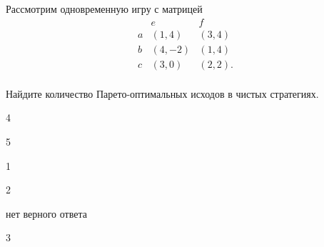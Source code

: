 
\begin{question}
Рассмотрим одновременную игру с матрицей \[
\begin{matrix}
   & e & f \\
a  & (1, 4) & (3, 4) \\
b  & (4, -2) & (1, 4) \\
c  & (3, 0) & (2, 2). \\
\end{matrix}
\]

Найдите количество Парето-оптимальных исходов в чистых стратегиях.
\begin{answerlist}
  \item 4
  \item 5
  \item 1
  \item 2
  \item нет верного ответа
  \item 3
\end{answerlist}
\end{question}


